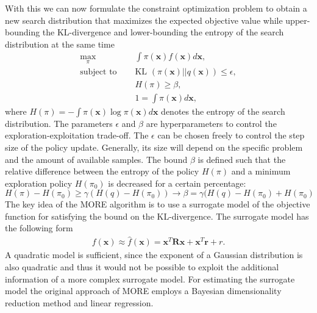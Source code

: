 With this we can now formulate the constraint optimization
problem to obtain a new search
distribution that maximizes the expected objective value
while upper-bounding the KL-divergence and lower-bounding the entropy
of the search distribution at the same time
\begin{equation*}
  \begin{aligned}
    \max_{\pi} \quad &\int \pi(\mathbf{x}) f(\mathbf{x}) d\mathbf{x}, \\
    \text{subject to } \quad &\text{KL }(\pi(\mathbf{x})||q(\mathbf{x}))
    \leq \epsilon, \\
     &H(\pi) \geq \beta, \\
     &1 = \int \pi(\mathbf{x}) d\mathbf{x},
  \end{aligned}
\end{equation*}
where $H(\pi) = - \int \pi(\mathbf{x}) \log \pi(\mathbf{x}) d\mathbf{x}$
denotes the entropy of the search distribution.
The parameters $\epsilon$ and $\beta$ are hyperparameters to control the
exploration-exploitation trade-off.
The $\epsilon$ can be chosen freely to control the step size of the
policy update. Generally, its size will depend on the specific problem
and the amount of available samples.
The bound $\beta$ is defined such that the relative difference
between the entropy
of the policy $H(\pi)$ and a minimum exploration policy $H(\pi_0)$ is
decreased
for a certain percentage:
$$ H(\pi) - H(\pi_0) \geq \gamma (H(q) - H(\pi_0))
\rightarrow \beta = \gamma (H(q) - H(\pi_0) + H(\pi_0) $$
The key idea of the MORE algorithm is to use a surrogate model
of the objective function
for satisfying the bound on the KL-divergence.
The surrogate model has the following form
\begin{align*}
  f(\mathbf{x}) \approx \hat{f}(\mathbf{x}) =
  \mathbf{x}^T \mathbf{R} \mathbf{x}
  + \mathbf{x}^T \mathbf{r} + r.
\end{align*}
A quadratic model is sufficient, since the exponent
of a Gaussian distribution
is also quadratic and thus it would not be possible to exploit
the additional information of a more complex surrogate model.
For estimating the surrogate model the original approach of
MORE employs a Bayesian dimensionality
reduction method and linear regression. 


